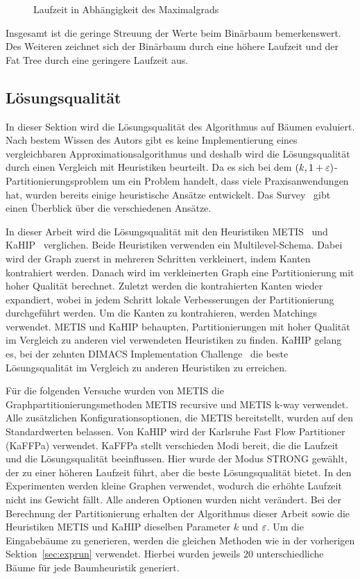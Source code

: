 \begin{figure}[h]
    \centering
    
    \caption{Laufzeit in Abhängigkeit des Maximalgrads\label{fig:rundeg}}
\end{figure}

Insgesamt ist die geringe Streuung der Werte beim Binärbaum bemerkenswert.
Des Weiteren zeichnet sich der Binärbaum durch eine höhere Laufzeit und der Fat Tree durch eine geringere Laufzeit aus.

\subsection{Lösungsqualität}
In dieser Sektion wird die Lösungsqualität des Algorithmus auf Bäumen evaluiert.
Nach bestem Wissen des Autors gibt es keine Implementierung eines vergleichbaren Approximationsalgorithmus und deshalb wird die Lösungsqualität durch einen Vergleich mit Heuristiken beurteilt.
Da es sich bei dem $(k,1+\varepsilon)$\hyp Partitionierungsproblem um ein Problem handelt, dass viele Praxisanwendungen hat, wurden bereits einige heuristische Ansätze entwickelt. 
Das Survey~\cite{BMS+16} gibt einen Überblick über die verschiedenen Ansätze.

In dieser Arbeit wird die Lösungsqualität mit den Heuristiken METIS~\cite{KK98} und KaHIP~\cite{SS13} verglichen.
Beide Heuristiken verwenden ein Multilevel-Schema.
Dabei wird der Graph zuerst in mehreren Schritten verkleinert, indem Kanten kontrahiert werden.
Danach wird im verkleinerten Graph eine Partitionierung mit hoher Qualität berechnet.
Zuletzt werden die kontrahierten Kanten wieder expandiert, wobei in jedem Schritt lokale Verbesserungen der Partitionierung durchgeführt werden.
Um die Kanten zu kontrahieren, werden Matchings verwendet.
METIS und KaHIP behaupten, Partitionierungen mit hoher Qualität im Vergleich zu anderen viel verwendeten Heuristiken zu finden.
KaHIP gelang es, bei der zehnten DIMACS Implementation Challenge~\cite{BMS+13} die beste Lösungsqualität im Vergleich zu anderen Heuristiken zu erreichen.

Für die folgenden Versuche wurden von METIS die Graphpartitionierungsmethoden METIS recursive und METIS k-way verwendet.
Alle zusätzlichen Konfigurationsoptionen, die METIS bereitstellt, wurden auf den Standardwerten belassen.
Von KaHIP wird der Karlsruhe Fast Flow Partitioner (KaFFPa) verwendet.
KaFFPa stellt verschieden Modi bereit, die die Laufzeit und die Lösungsqualität beeinflussen.
Hier wurde der Modus STRONG gewählt, der zu einer höheren Laufzeit führt, aber die beste Lösungsqualität bietet.
In den Experimenten werden kleine Graphen verwendet, wodurch die erhöhte Laufzeit nicht ins Gewicht fällt.
Alle anderen Optionen wurden nicht verändert.
Bei der Berechnung der Partitionierung erhalten der Algorithmus dieser Arbeit sowie die Heuristiken METIS und KaHIP dieselben Parameter $k$ und $\varepsilon$.
Um die Eingabebäume zu generieren, werden die gleichen Methoden wie in der vorherigen Sektion~\ref{sec:exprun} verwendet.
Hierbei wurden jeweils 20 unterschiedliche Bäume für jede Baumheuristik generiert.

